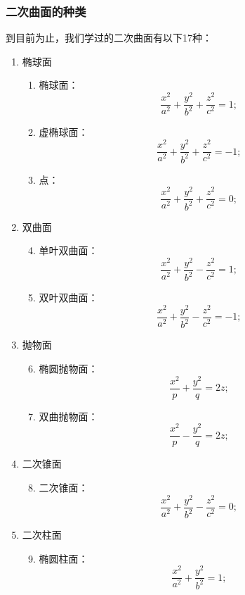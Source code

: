 \subsubsection{二次曲面的种类}\label{section:解析几何.二次曲面的种类}
到目前为止，我们学过的二次曲面有以下17种：
\begin{enumerate}[label={\chinese*.}]
	\item 椭球面
	\begin{enumerate}[label={\arabic*.}]
		\item 椭球面：\[
			\frac{x^2}{a^2}+\frac{y^2}{b^2}+\frac{z^2}{c^2}=1;
		\]

		\item 虚椭球面：\[
			\frac{x^2}{a^2}+\frac{y^2}{b^2}+\frac{z^2}{c^2}=-1;
		\]

		\item 点：\[
			\frac{x^2}{a^2}+\frac{y^2}{b^2}+\frac{z^2}{c^2}=0;
		\]
	\end{enumerate}

	\item 双曲面
	\begin{enumerate}[label={\arabic*.}]
		\setcounter{enumii}{3}
		\item 单叶双曲面：\[
			\frac{x^2}{a^2}+\frac{y^2}{b^2}-\frac{z^2}{c^2}=1;
		\]

		\item 双叶双曲面：\[
			\frac{x^2}{a^2}+\frac{y^2}{b^2}-\frac{z^2}{c^2}=-1;
		\]
	\end{enumerate}

	\item 抛物面
	\begin{enumerate}[label={\arabic*.}]
		\setcounter{enumii}{5}
		\item 椭圆抛物面：\[
			\frac{x^2}{p}+\frac{y^2}{q}=2z;
		\]

		\item 双曲抛物面：\[
			\frac{x^2}{p}-\frac{y^2}{q}=2z;
		\]
	\end{enumerate}

	\item 二次锥面
	\begin{enumerate}[label={\arabic*.}]
		\setcounter{enumii}{7}
		\item 二次锥面：\[
			\frac{x^2}{a^2}+\frac{y^2}{b^2}-\frac{z^2}{c^2}=0;
		\]
	\end{enumerate}

	\item 二次柱面
	\begin{enumerate}[label={\arabic*.}]
		\setcounter{enumii}{8}
		\item 椭圆柱面：\[
			\frac{x^2}{a^2}+\frac{y^2}{b^2}=1;
		\]


\end{enumerate}
\end{enumerate}
